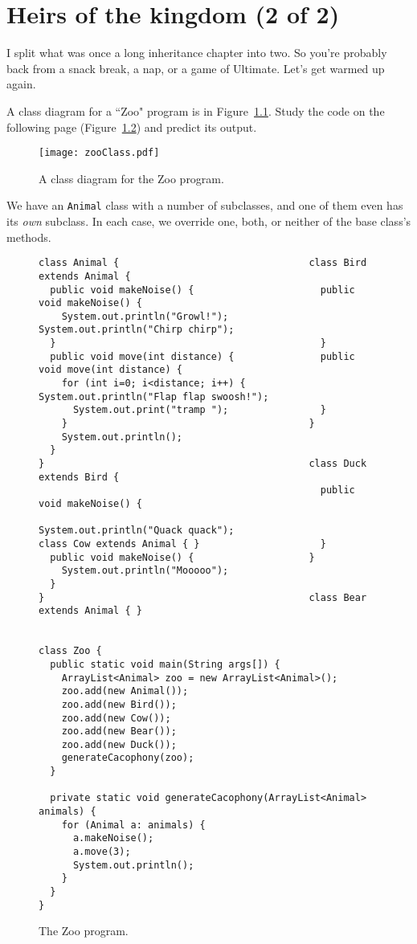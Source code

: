 
\chapter{Heirs of the kingdom (2 of 2)}

I split what was once a long inheritance chapter into two. So you're probably
back from a snack break, a nap, or a game of Ultimate. Let's get warmed up
again.

A class diagram for a ``Zoo" program is in Figure~\ref{fig:zooClass}. Study
the code on the following page (Figure~\ref{fig:zooCode}) and predict its
output.

\begin{figure}[ht]
\centering
\texttt{[image: zooClass.pdf]}
\caption{A class diagram for the Zoo program.}
\label{fig:zooClass}
\end{figure}

We have an \texttt{Animal} class with a number of subclasses, and one of them
even has its \textit{own} subclass. In each case, we override one, both, or
neither of the base class's methods.

\begin{figure}
\begin{Verbatim}[fontsize=\scriptsize,samepage=true,frame=single]
class Animal {                                 class Bird extends Animal {
  public void makeNoise() {                      public void makeNoise() {
    System.out.println("Growl!");                  System.out.println("Chirp chirp");
  }                                              }
  public void move(int distance) {               public void move(int distance) {
    for (int i=0; i<distance; i++) {               System.out.println("Flap flap swoosh!");
      System.out.print("tramp ");                }
    }                                          }
    System.out.println();                      
  }
}                                              class Duck extends Bird {
                                                 public void makeNoise() {
                                                   System.out.println("Quack quack");
class Cow extends Animal { }                     }
  public void makeNoise() {                    }
    System.out.println("Mooooo");              
  }
}                                              class Bear extends Animal { }


class Zoo {
  public static void main(String args[]) {
    ArrayList<Animal> zoo = new ArrayList<Animal>();
    zoo.add(new Animal());
    zoo.add(new Bird());
    zoo.add(new Cow());
    zoo.add(new Bear());
    zoo.add(new Duck());
    generateCacophony(zoo);
  }

  private static void generateCacophony(ArrayList<Animal> animals) {
    for (Animal a: animals) {
      a.makeNoise();
      a.move(3);
      System.out.println();
    }
  }
}\end{Verbatim}
\caption{The Zoo program.}
\label{fig:zooCode}
\end{figure}

